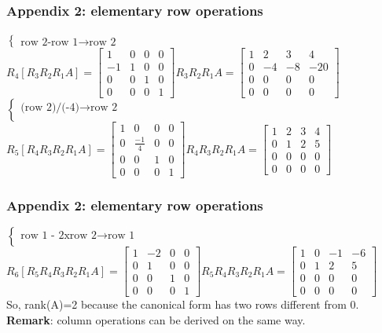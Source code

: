\begin{frame}
	\frametitle{Appendix 2: elementary row operations}
	$\begin{cases}
	\text{row 2-row 1} \rightarrow \text{row 2}
	\end{cases}$\\ $R_4[R_3R_2R_1A]=\begin{bmatrix}
	1 & 0 & 0& 0\\
	-1 & 1 & 0 & 0\\
	0 & 0 & 1 & 0\\
	0 & 0 & 0 & 1
	\end{bmatrix}R_3R_2R_1A=\begin{bmatrix}
	1 & 2 & 3 & 4\\
	0 & -4 & -8 & -20\\
	0 & 0 & 0 & 0\\
	0 & 0 & 0 & 0
	\end{bmatrix}$\\
	$\begin{cases}
	\text{(row 2)/(-4)} \rightarrow \text{row 2}\\
	\end{cases}$\\ $R_5[R_4R_3R_2R_1A]=\begin{bmatrix}
	1 & 0 & 0& 0\\
	0 & \frac{-1}{4} & 0 & 0\\
	0 & 0 & 1 & 0\\
	0 & 0 & 0 & 1
	\end{bmatrix}R_4R_3R_2R_1A=\begin{bmatrix}
	1 & 2 & 3 & 4\\
	0 & 1 & 2 & 5\\
	0 & 0 & 0 & 0\\
	0 & 0 & 0 & 0
	\end{bmatrix}$
\end{frame}

\begin{frame}
	\frametitle{Appendix 2: elementary row operations}
	$\begin{cases}
	\text{row 1 - 2xrow 2} \rightarrow \text{row 1}\\
	\end{cases}$\\ $R_6[R_5R_4R_3R_2R_1A]=\begin{bmatrix}
	1 & -2 & 0& 0\\
	0 & 1 & 0 & 0\\
	0 & 0 & 1 & 0\\
	0 & 0 & 0 & 1
	\end{bmatrix}R_5R_4R_3R_2R_1A=\begin{bmatrix}
	1 & 0 & -1 & -6\\
	0 & 1 & 2 & 5\\
	0 & 0 & 0 & 0\\
	0 & 0 & 0 & 0
	\end{bmatrix}$\\
	So, rank(A)=2 because the canonical form has two rows different from 0.\\
	\textbf{Remark}: column operations can be derived on the same way.
\end{frame}

